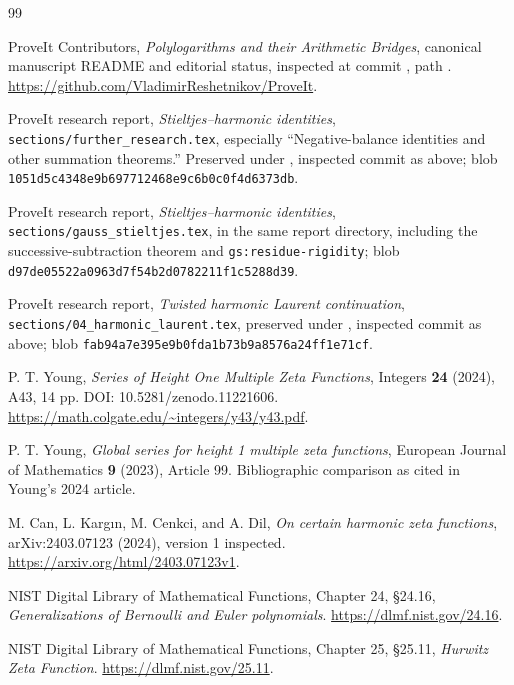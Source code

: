 \begin{thebibliography}{99}
ProveIt Contributors, \emph{Polylogarithms and their Arithmetic Bridges},
canonical manuscript README and editorial status, inspected at commit
\sourcecommit, path
.
\url{https://github.com/VladimirReshetnikov/ProveIt}.

ProveIt research report, \emph{Stieltjes--harmonic identities},
\texttt{sections/further\_research.tex}, especially ``Negative-balance
identities and other summation theorems.'' Preserved under
, inspected commit
as above; blob \texttt{1051d5c4348e9b697712468e9c6b0c0f4d6373db}.

ProveIt research report, \emph{Stieltjes--harmonic identities},
\texttt{sections/gauss\_stieltjes.tex}, in the same report directory,
including the successive-subtraction theorem and
\texttt{gs:residue-rigidity}; blob
\texttt{d97de05522a0963d7f54b2d0782211f1c5288d39}.

ProveIt research report, \emph{Twisted harmonic Laurent continuation},
\texttt{sections/04\_harmonic\_laurent.tex}, preserved under
, inspected commit as above;
blob \texttt{fab94a7e395e9b0fda1b73b9a8576a24ff1e71cf}.

P. T. Young, \emph{Series of Height One Multiple Zeta Functions},
Integers \textbf{24} (2024), A43, 14 pp.
DOI: 10.5281/zenodo.11221606.
\url{https://math.colgate.edu/~integers/y43/y43.pdf}.

P. T. Young, \emph{Global series for height 1 multiple zeta functions},
European Journal of Mathematics \textbf{9} (2023), Article 99.
Bibliographic comparison as cited in Young's 2024 article.

M. Can, L. Karg\i n, M. Cenkci, and A. Dil,
\emph{On certain harmonic zeta functions}, arXiv:2403.07123 (2024),
version 1 inspected.
\url{https://arxiv.org/html/2403.07123v1}.

NIST Digital Library of Mathematical Functions,
Chapter 24, \S24.16, \emph{Generalizations of Bernoulli and Euler polynomials}.
\url{https://dlmf.nist.gov/24.16}.

NIST Digital Library of Mathematical Functions,
Chapter 25, \S25.11, \emph{Hurwitz Zeta Function}.
\url{https://dlmf.nist.gov/25.11}.
\end{thebibliography}
